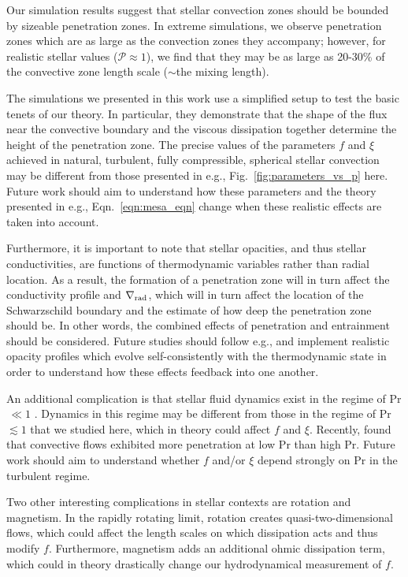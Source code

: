 \documentclass[twocolumn]{aastex631}
\newcommand{\gradrad}{\ensuremath{\nabla_{\rm{rad}}}}
\newcommand{\mP}{\ensuremath{\mathcal{P}}}
\newcommand\Pran{\ensuremath{\mathrm{Pr}}}
\begin{document}
Our simulation results suggest that stellar convection zones should be bounded by sizeable penetration zones.
In extreme simulations, we observe penetration zones which are as large as the convection zones they accompany; however, for realistic stellar values ($\mP \approx 1$), we find that they may be as large as 20-30\% of the convective zone length scale ($\sim$the mixing length).

The simulations we presented in this work use a simplified setup to test the basic tenets of our theory.
In particular, they demonstrate that the shape of the flux near the convective boundary and the viscous dissipation together determine the height of the penetration zone.
The precise values of the parameters $f$ and $\xi$ achieved in natural, turbulent, fully compressible, spherical stellar convection may be different from those presented in e.g., Fig.~\ref{fig:parameters_vs_p} here.
Future work should aim to understand how these parameters and the theory presented in e.g., Eqn.~\ref{eqn:mesa_eqn} change when these realistic effects are taken into account.

Furthermore, it is important to note that stellar opacities, and thus stellar conductivities, are functions of thermodynamic variables rather than radial location.
As a result, the formation of a penetration zone will in turn affect the conductivity profile and $\gradrad$, which will in turn affect the location of the Schwarzschild boundary and the estimate of how deep the penetration zone should be.
In other words, the combined effects of penetration and entrainment should be considered.
Future studies should follow e.g., \citet{kapyla_etal_2017} and implement realistic opacity profiles which evolve self-consistently with the thermodynamic state in order to understand how these effects feedback into one another.

An additional complication is that stellar fluid dynamics exist in the regime of Pr$\,\ll1$ \citep{garaud2021}.
Dynamics in this regime may be different from those in the regime of Pr $\lesssim 1$ that we studied here, which in theory could affect $f$ and $\xi$.
Recently, \citet{kapyla2021} found that convective flows exhibited more penetration at low Pr than high Pr.
Future work should aim to understand whether $f$ and/or $\xi$ depend strongly on $\Pran$ in the turbulent regime.

Two other interesting complications in stellar contexts are rotation and magnetism.
In the rapidly rotating limit, rotation creates quasi-two-dimensional flows, which could affect the length scales on which dissipation acts and thus modify $f$.
Furthermore, magnetism adds an additional ohmic dissipation term, which could in theory drastically change our hydrodynamical measurement of $f$.
\end{document}
